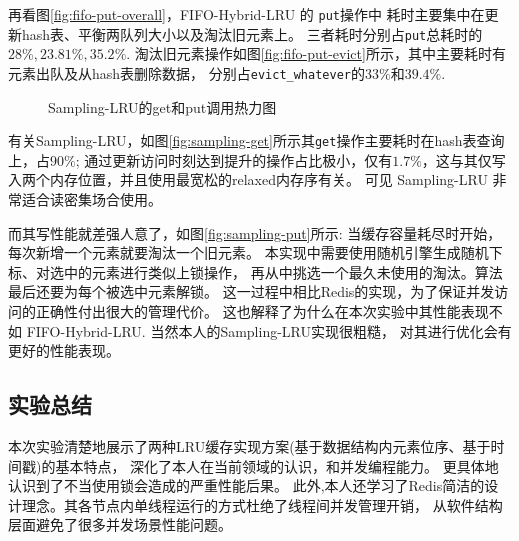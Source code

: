 再看图\ref{fig:fifo-put-overall}，FIFO-Hybrid-LRU 的 \verb|put|操作中
耗时主要集中在更新hash表、平衡两队列大小以及淘汰旧元素上。
三者耗时分别占\verb|put|总耗时的 $28\%, 23.81\%, 35.2\%$. 
淘汰旧元素操作如图\ref{fig:fifo-put-evict}所示，其中主要耗时有元素出队及从hash表删除数据，
分别占\verb|evict_whatever|的$33\%$和$39.4\%$.

\begin{figure}
    \centering
    \caption{Sampling-LRU的get和put调用热力图}
    \label{fig:sampling-get-put}
\end{figure}

有关Sampling-LRU，如图\ref{fig:sampling-get}所示其\verb|get|操作主要耗时在hash表查询上，占$90\%$;
通过更新访问时刻达到提升的操作占比极小，仅有$1.7\%$，这与其仅写入两个内存位置，并且使用最宽松的relaxed内存序有关。
可见 Sampling-LRU 非常适合读密集场合使用。

而其写性能就差强人意了，如图\ref{fig:sampling-put}所示:
当缓存容量耗尽时开始，每次新增一个元素就要淘汰一个旧元素。
本实现中需要使用随机引擎生成随机下标、对选中的元素进行类似上锁操作，
再从中挑选一个最久未使用的淘汰。算法最后还要为每个被选中元素解锁。
这一过程中相比Redis的实现，为了保证并发访问的正确性付出很大的管理代价。
这也解释了为什么在本次实验中其性能表现不如 FIFO-Hybrid-LRU.
当然本人的Sampling-LRU实现很粗糙，
对其进行优化会有更好的性能表现。

\subsection{实验总结}

本次实验清楚地展示了两种LRU缓存实现方案(基于数据结构内元素位序、基于时间戳)的基本特点，
深化了本人在当前领域的认识，和并发编程能力。
更具体地认识到了不当使用锁会造成的严重性能后果。
此外,本人还学习了Redis简洁的设计理念。其各节点内单线程运行的方式杜绝了线程间并发管理开销，
从软件结构层面避免了很多并发场景性能问题。

